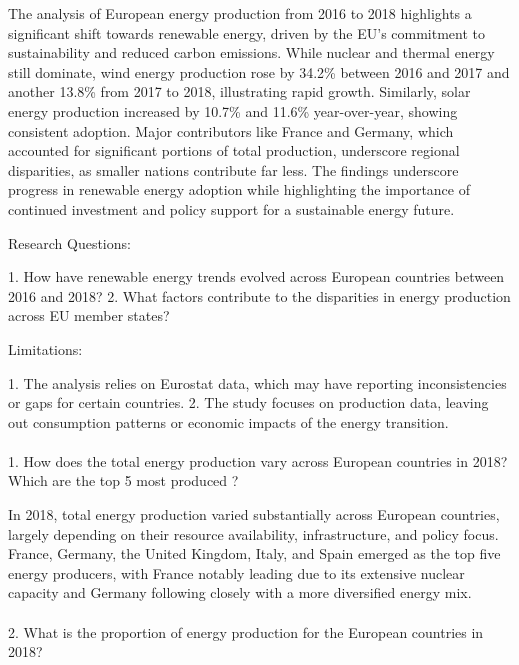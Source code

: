 \documentclass[
  letterpaper,
  DIV=11,
  numbers=noendperiod]{scrartcl}
\makeatletter
\let\oldparagraph\paragraph
\renewcommand{\paragraph}{
    \@ifstar
      \xxxParagraphStar
      \xxxParagraphNoStar
  }
\newcommand{\xxxParagraphStar}[1]{\oldparagraph*{#1}\mbox{}}
\newcommand{\xxxParagraphNoStar}[1]{\oldparagraph{#1}\mbox{}}
\makeatother
\begin{document}
The analysis of European energy production from 2016 to 2018 highlights
a significant shift towards renewable energy, driven by the EU's
commitment to sustainability and reduced carbon emissions. While nuclear
and thermal energy still dominate, wind energy production rose by 34.2\%
between 2016 and 2017 and another 13.8\% from 2017 to 2018, illustrating
rapid growth. Similarly, solar energy production increased by 10.7\% and
11.6\% year-over-year, showing consistent adoption. Major contributors
like France and Germany, which accounted for significant portions of
total production, underscore regional disparities, as smaller nations
contribute far less. The findings underscore progress in renewable
energy adoption while highlighting the importance of continued
investment and policy support for a sustainable energy future.

Research Questions:

1.⁠ ⁠How have renewable energy trends evolved across European countries
between 2016 and 2018? 2.⁠ ⁠What factors contribute to the disparities in
energy production across EU member states?

Limitations:

1.⁠ ⁠The analysis relies on Eurostat data, which may have reporting
inconsistencies or gaps for certain countries. 2.⁠ ⁠The study focuses on
production data, leaving out consumption patterns or economic impacts of
the energy transition.

\paragraph{1. How does the total energy production vary across European
countries in 2018? Which are the top 5 most produced
?}\label{how-does-the-total-energy-production-vary-across-european-countries-in-2018-which-are-the-top-5-most-produced-1}

In 2018, total energy production varied substantially across European
countries, largely depending on their resource availability,
infrastructure, and policy focus. France, Germany, the United Kingdom,
Italy, and Spain emerged as the top five energy producers, with France
notably leading due to its extensive nuclear capacity and Germany
following closely with a more diversified energy mix.

\paragraph{2. What is the proportion of energy production for the
European countries in
2018?}\label{what-is-the-proportion-of-energy-production-for-the-european-countries-in-2018}
\end{document}
